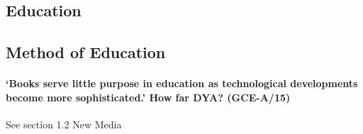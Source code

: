 \documentclass[../../main]{subfiles}
\begin{document}
\subsection{Education}

\subsection{Method of Education}

\paragraph{`Books serve little purpose in education as technological developments become more sophisticated.' How far DYA? (GCE-A/15)} See section 1.2 New Media
\end{document}
